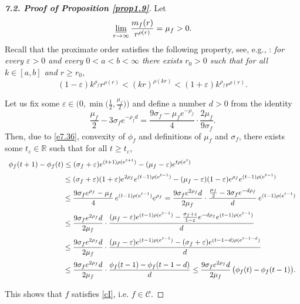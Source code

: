 \documentclass[11pt, oneside]{amsart}
\begin{document}
\begin{proof}[{\bf 7.2. Proof of Proposition \ref{prop1.9}}]
Let
\[
\varliminf_{r\rightarrow\infty}\frac{m_f(r)}{r^{\rho(r)}}=\mu_f>0.
\]
Recall that the proximate order satisfies the following property, see, e.g., \cite{L}: {\em for every $\varepsilon>0$ and every $0<a<b<\infty$
there exists $r_0>0$ such that for all $k\in [a,b]$ and $r\ge r_0$,}
\begin{equation}\label{e7.36}
(1-\varepsilon)k^{\rho_f}r^{\rho(r)}<(kr)^{\rho(kr)}<(1+\varepsilon)k^{\rho_f}r^{\rho(r)}.
\end{equation}

Let us fix some $\varepsilon\in\bigl(0, \min\bigl(\frac 12,\frac{\mu_f}{2}\bigr)\bigr)$ and define a number $d>0$ from the identity
\begin{equation}\label{e7.37}
\frac{\mu_f}{2}-3\sigma_f e^{-\rho_f d}=\frac{9\sigma_f -\mu_f e^{-\rho_f}}{4}\cdot \frac{2\mu_f}{9\sigma_f}.
\end{equation}
Then, due to \eqref{e7.36}, convexity of $\phi_f$ and definitions of $\mu_f$ and $\sigma_f$,  there exists some $t_\varepsilon\in\mathbb R$ such that for all $t\ge t_\varepsilon$, 
\[
\begin{array}{l}
\displaystyle  \phi_f(t+1)-\phi_f(t) \le 
(\sigma_f+\varepsilon)e^{(t+1)\rho(e^{t+1})}-(\mu_f-\varepsilon)e^{t\rho(e^{t})}\medskip\\
\displaystyle \ \ \quad\qquad\qquad\qquad\le (\sigma_f+\varepsilon)(1+\varepsilon)e^{2\rho_f}e^{(t-1)\rho(e^{t-1})} -(\mu_f-\varepsilon)(1-\varepsilon)e^{\rho_f }e^{(t-1)\rho(e^{t-1})}\medskip\\
\displaystyle \ \ \quad\qquad\qquad\qquad \le \frac{9\sigma_f e^{\rho_f}-\mu_f}{4}\, e^{(t-1)\rho(e^{t-1})}e^{\rho_f}=\frac{9\sigma_f e^{2\rho_f}d}{2\mu_f}\cdot \frac{\frac{\mu_f}{2}-3\sigma_f e^{-d\rho_f}}{d}\,e^{(t-1)\rho(e^{t-1})}\medskip\\
\displaystyle 
\ \ \quad\qquad\qquad\qquad\le \frac{9\sigma_f e^{2\rho_f}d}{2\mu_f}\cdot
\frac{(\mu_f-\varepsilon)e^{(t-1)\rho(e^{t-1})}-\frac{\sigma_f+\varepsilon}{1-\varepsilon}e^{-d\rho_f }e^{(t-1)\rho(e^{t-1})}}{d}\medskip\\
\displaystyle \ \ \quad\qquad\qquad\qquad
\le \frac{9\sigma_f e^{2\rho_f}d}{2\mu_f}\cdot\frac{(\mu_f-\varepsilon)e^{(t-1)\rho(e^{t-1})}-(\sigma_f+\varepsilon)e^{(t-1-d)\rho(e^{t-1-d})}}{d}\medskip\\
\displaystyle \ \ \quad\qquad\qquad\qquad
\le\frac{9\sigma_f e^{2\rho_f}d}{2\mu_f}\cdot\frac{\phi_f(t-1)-\phi_f(t-1-d)}{d}
\le \frac{9\sigma_f e^{2\rho_f}d}{2\mu_f}\,\bigl(\phi_f(t)-\phi_f(t-1)\bigr).
\end{array}
\]

This shows that $f$ satisfies \eqref{cI}, i.e. $f\in\mathscr C$.
\end{proof}
\end{document}
